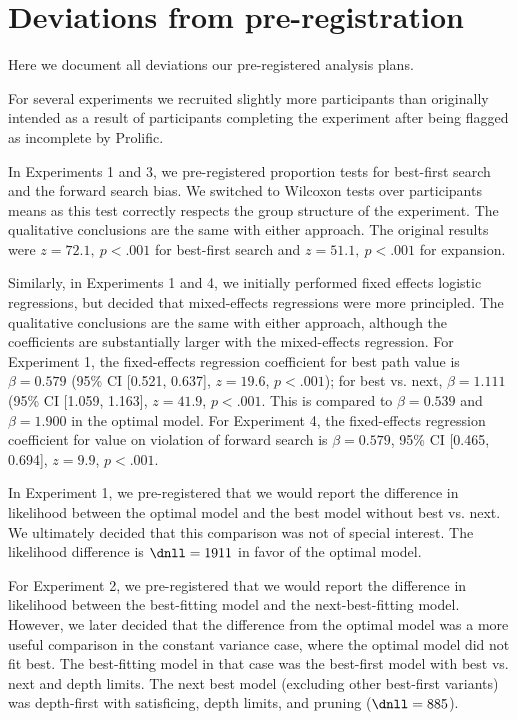 
\label{app:planning}

\section{Deviations from pre-registration}\label{app:planning-deviations}
Here we document all deviations our pre-registered analysis plans.

For several experiments we recruited slightly more participants than originally intended as a result of participants completing the experiment after being flagged as incomplete by Prolific.

In Experiments 1 and 3, we pre-registered proportion tests for best-first search and the forward search bias. We switched to Wilcoxon tests over participants means as this test correctly respects the group structure of the experiment. The qualitative conclusions are the same with either approach. The original results were $z=72.1,\ p < .001$ for best-first search and $z=51.1,\ p < .001$ for expansion.

Similarly, in Experiments 1 and 4, we initially performed fixed effects logistic regressions, but decided that mixed-effects regressions were more principled. The qualitative conclusions are the same with either approach, although the coefficients are substantially larger with the mixed-effects regression. For Experiment 1, the fixed-effects regression coefficient for best path value is $\beta = 0.579$ (95\% CI [0.521, 0.637], $z = 19.6$, $p < .001$); for best vs. next, $\beta = 1.111$ (95\% CI [1.059, 1.163], $z = 41.9$, $p < .001$. This is compared to $\beta = 0.539$ and $\beta = 1.900$ in the optimal model. For Experiment 4, the fixed-effects regression coefficient for value on violation of forward search is $\beta = 0.579$, 95\% CI [0.465, 0.694], $z = 9.9$, $p < .001$.

In Experiment 1, we pre-registered that we would report the difference in likelihood between the optimal model and the best model without best vs. next. We ultimately decided that this comparison was not of special interest. The likelihood difference is $\dnll = 1911$ in favor of the optimal model.

For Experiment 2, we pre-registered that we would report the difference in likelihood between the best-fitting model and the next-best-fitting model. However, we later decided that the difference from the optimal model was a more useful comparison in the constant variance case, where the optimal model did not fit best. The best-fitting model in that case was the best-first model with best vs. next and depth limits. The next best model (excluding other best-first variants) was depth-first with satisficing, depth limits, and pruning ($\dnll = 885$).

